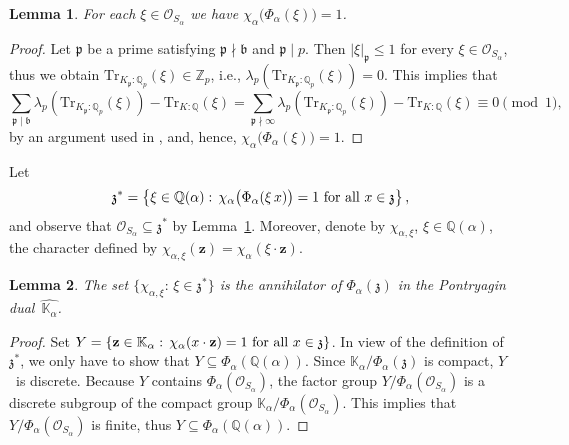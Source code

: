 \documentclass[12pt]{amsart}
\newtheorem{lemma}{Lemma}[section]
\theoremstyle{definition}
\theoremstyle{remark}
\numberwithin{equation}{section}
\begin{document}
\begin{lemma} \label{l:chixi}
For each $\xi \in \mathcal{O}_{S_\alpha}$ we have $\chi_\alpha\big(\Phi_\alpha(\xi)\big) = 1$.
\end{lemma}

\begin{proof}
Let $\mathfrak{p}$ be a prime satisfying $\mathfrak{p} \nmid \mathfrak{b}$ and $\mathfrak{p} \mid p$.
Then $|\xi|_\mathfrak{p} \le 1$ for every $\xi \in \mathcal{O}_{S_\alpha}$, thus we obtain $\mathrm{Tr}_{K_\mathfrak{p}:\mathbb{Q}_p}(\xi) \in \mathbb{Z}_p$, i.e., $\lambda_p(\mathrm{Tr}_{K_\mathfrak{p}:\mathbb{Q}_p}(\xi)) = 0$.
This implies that
\[
\sum_{\mathfrak{p}\mid\mathfrak{b}} \lambda_p(\mathrm{Tr}_{K_\mathfrak{p}:\mathbb{Q}_p}(\xi)) - \mathrm{Tr}_{K:\mathbb{Q}}(\xi) = \sum_{\mathfrak{p}\nmid\infty} \lambda_p(\mathrm{Tr}_{K_\mathfrak{p}:\mathbb{Q}_p}(\xi))  - \mathrm{Tr}_{K:\mathbb{Q}}(\xi) \equiv 0 \pmod{1},
\]
by an argument used in \cite[proof of Lemma~4.1.5]{Tate:67}, and, hence, ${\chi_{\alpha}\big(\Phi_\alpha(\xi)\big) = 1}$.
\end{proof}

Let
\begin{equation}\label{jot}
\mathfrak{z}^* = \big\{\xi \in \mathbb{Q}(\alpha):\, \chi_\alpha\big(\Phi_\alpha(\xi\, x)\big) = 1\ \hbox{for
all}\ x \in \mathfrak{z}\big\}\,,
\end{equation}
and observe that $\mathcal{O}_{S_\alpha} \subseteq \mathfrak{z}^*$ by Lemma~\ref{l:chixi}.
Moreover, denote by $\chi_{\alpha,\xi}$, $\xi \in \mathbb{Q}(\alpha)$, the character defined by $\chi_{\alpha,\xi}(\mathbf{z}) = \chi_\alpha(\xi \cdot \mathbf{z})$.

\begin{lemma} \label{l:ann}
The set $\{\chi_{\alpha,\xi}:\, \xi \in \mathfrak{z}^*\}$ is the annihilator of $\Phi_\alpha(\mathfrak{z})$ in the Pontryagin dual~$\widehat{\mathbb{K}_\alpha}$.
\end{lemma}

\begin{proof}
Set $Y = \{\mathbf{z} \in \mathbb{K}_\alpha:\, \chi_\alpha(x \cdot \mathbf{z}) = 1\ \hbox{for all}\ x \in \mathfrak{z}\}$.
In view of the definition of~$\mathfrak{z}^*$, we only have to show that $Y \subseteq \Phi_\alpha(\mathbb{Q}(\alpha))$.
Since $\mathbb{K}_\alpha / \Phi_\alpha(\mathfrak{z})$ is compact, $Y$~is discrete.
Because $Y$ contains $\Phi_\alpha(\mathcal{O}_{S_\alpha})$, the factor group $Y / \Phi_\alpha(\mathcal{O}_{S_\alpha})$ is a discrete subgroup of the compact group $\mathbb{K}_\alpha / \Phi_\alpha(\mathcal{O}_{S_\alpha})$.
This implies that $Y / \Phi_\alpha(\mathcal{O}_{S_\alpha})$ is finite, thus $Y \subseteq \Phi_\alpha(\mathbb{Q}(\alpha))$.
\end{proof}
\end{document}
